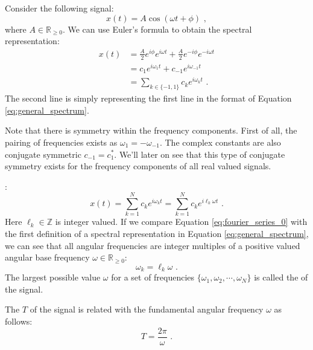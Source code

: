 Consider the following signal:
\begin{equation}
x(t)=A\cos(\omega t+\phi) \,\,,
\end{equation}
where $A\in \mathbb{R}_{\ge 0}$. We can use Euler's formula to obtain the spectral representation:
\begin{align}
x(t) & = \frac{A}{2}e^{i\phi}e^{i\omega t} + \frac{A}{2}e^{-i\phi}e^{-i\omega t} \\
     & = c_1 e^{i\omega_1 t} + c_{-1} e^{i\omega_{-1} t} \\
     & = \sum_{k\in\{-1,1\}} c_k e^{i\omega_k t} \,\,.
\end{align}
The second line is simply representing the first line in the format of Equation \ref{eq:general_spectrum}.

Note that there is symmetry within the frequency components. First of all, the pairing of frequencies exists as $\omega_{1}=-\omega_{-1}$. The complex constants are also conjugate symmetric $c_{-1} = c_{1}^*$. We'll later on see that this type of conjugate symmetry exists for the frequency components of all real valued signals.

:
\begin{equation}
x(t) = \sum_{k=1}^N c_k e^{i \omega_k t} = \sum_{k=1}^N c_k e^{i \ell_k \omega t} \,\,.
\label{eq:fourier_series_0}
\end{equation}
Here $\ell_k \in \mathbb{Z}$ is integer valued. If we compare Equation \ref{eq:fourier_series_0} with the first definition of a spectral representation in Equation \ref{eq:general_spectrum}, we can see that all angular frequencies are integer multiples of a positive valued angular base frequency $\omega \in \mathbb{R}_{\ge 0}$:
\begin{equation}
\omega_k = \ell_k\omega \,\,.
\label{eq:integer_multiple}
\end{equation}
The largest possible value $\omega$ for a set of frequencies $\{\omega_1,\omega_2,\cdots,\omega_N\}$ is called the \emph{} of the signal.

The \emph{} $T$ of the signal is related with the fundamental angular frequency $\omega$ as follows:
\begin{equation}
\boxed{
T = \frac{2\pi}{\omega}
} \,\,.
\label{eq:fundamental_period}
\end{equation}

